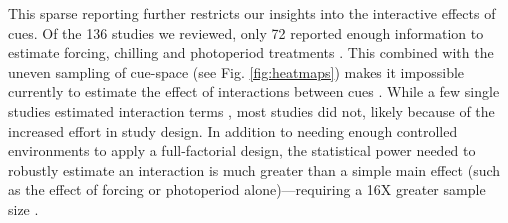 \documentclass[11pt,letter]{article}
\begin{document}
This sparse reporting further restricts our insights into the interactive effects of cues. Of the 136 studies we reviewed, only 72 reported enough information to estimate forcing, chilling and photoperiod treatments \citep{ettinger2020}. This combined with the uneven sampling of cue-space (see Fig. \ref{fig:heatmaps}) makes it impossible currently to estimate the effect of interactions between cues \citep{ettinger2020}. While a few single studies estimated interaction terms \citep[e.g.,][]{zohner2014}, most studies did not, likely because of the increased effort in study design. In addition to needing enough controlled environments to apply a full-factorial design, the statistical power needed to robustly estimate an interaction is much greater than a simple main effect (such as the effect of forcing or photoperiod alone)---requiring a 16X greater sample size \citep{regotherstories}.\\ 

\end{document}

